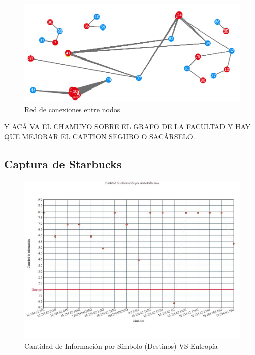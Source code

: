 \begin{figure}[H]
  \centering
    \includegraphics[scale=0.6]{imagenes/graficos/grafos/facultad.png}
  \caption{Red de conexiones entre nodos}
  \label{fig:ejemplo}
\end{figure}

Y ACÁ VA EL CHAMUYO SOBRE EL GRAFO DE LA FACULTAD Y HAY QUE MEJORAR EL CAPTION SEGURO O SACÁRSELO.

\newpage
\subsection{Captura de Starbucks}

\begin{figure}[H]
  \centering
    \includegraphics[scale=0.45]{imagenes/graficos/entropiaCantInf/04destino.jpg}
  \caption{Cantidad de Información por Símbolo (Destinos) VS Entropía}
  \label{fig:ejemplo}
\end{figure}

